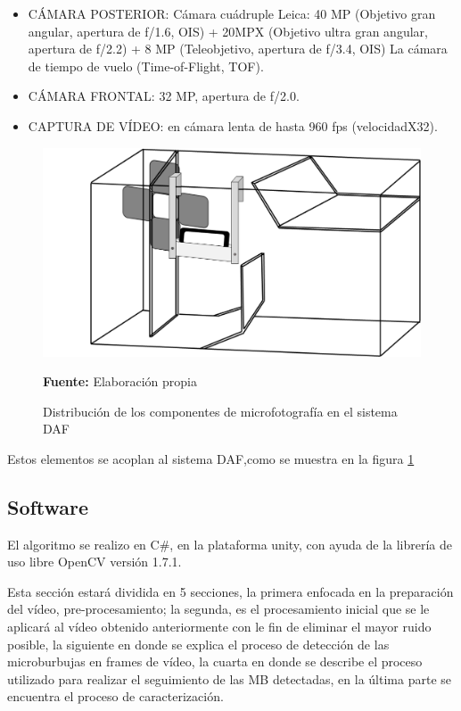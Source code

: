 \documentclass[12pt,twocolumn,a4paper]{article}
\begin{document}
\begin{itemize}
\item CÁMARA POSTERIOR: Cámara cuádruple Leica: 40 MP (Objetivo gran angular, apertura de f/1.6, OIS) + 20MPX (Objetivo ultra gran angular, apertura de f/2.2) + 8 MP (Teleobjetivo, apertura de f/3.4, OIS) La cámara de tiempo de vuelo (Time-of-Flight, TOF).
\item CÁMARA FRONTAL: 32 MP, apertura de f/2.0.
\item CAPTURA DE VÍDEO: en cámara lenta de hasta 960 fps (velocidadX32).
\end{itemize}


\begin{figure}
	\centering
	\includegraphics[scale=0.45]{Distribucion.png}
	\caption{Distribución de los componentes de microfotografía en el sistema DAF} \textbf{Fuente:} Elaboración propia
	\label{disDAF}
\end{figure}

Estos elementos se acoplan al sistema DAF,como se muestra en la figura \ref{disDAF}

\subsection{Software}
El algoritmo se realizo en C\#, en la plataforma unity, con ayuda de la librería de uso libre OpenCV versión 1.7.1.

Esta sección estará dividida en 5 secciones, la primera enfocada en la preparación del vídeo, pre-procesamiento;  la segunda, es  el procesamiento inicial que se le aplicará al vídeo obtenido anteriormente con le fin de eliminar el mayor ruido posible, la siguiente en donde se explica el proceso de detección de las microburbujas en frames de vídeo, la cuarta  en donde se describe el proceso utilizado para realizar el seguimiento de las MB detectadas, en la última parte se encuentra el proceso de caracterización.
\end{document}
